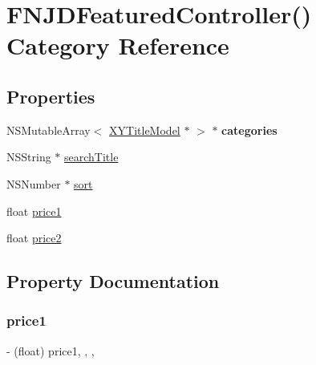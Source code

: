 \hypertarget{category_f_n_j_d_featured_controller_07_08}{}\section{F\+N\+J\+D\+Featured\+Controller() Category Reference}
\label{category_f_n_j_d_featured_controller_07_08}
\subsection*{Properties}
\begin{DoxyCompactItemize}
\item 
\mbox{\label{category_f_n_j_d_featured_controller_07_08_ad98913b93b2b63332d1c3a678a281e98}} 
N\+S\+Mutable\+Array$<$ \mbox{\hyperlink{interface_x_y_title_model}{X\+Y\+Title\+Model}} $\ast$ $>$ $\ast$ {\bfseries categories}
\item 
N\+S\+String $\ast$ \mbox{\hyperlink{category_f_n_j_d_featured_controller_07_08_a2c76c8a81027fe8b400019d9d3f67849}{search\+Title}}
\item 
N\+S\+Number $\ast$ \mbox{\hyperlink{category_f_n_j_d_featured_controller_07_08_a756519a525bcb373fc51903235eba9f1}{sort}}
\item 
float \mbox{\hyperlink{category_f_n_j_d_featured_controller_07_08_ab051d05006cadec48e487fa8a3b9250e}{price1}}
\item 
float \mbox{\hyperlink{category_f_n_j_d_featured_controller_07_08_a7941a3c7a3614827e29207768a5410d4}{price2}}
\end{DoxyCompactItemize}


\subsection{Property Documentation}
\mbox{\label{category_f_n_j_d_featured_controller_07_08_ab051d05006cadec48e487fa8a3b9250e}} 
\subsubsection{\texorpdfstring{price1}{price1}}
{\footnotesize\ttfamily -\/ (float) price1\hspace{0.3cm}{\ttfamily [read]}, {\ttfamily [write]}, {\ttfamily [nonatomic]}, {\ttfamily [assign]}}

